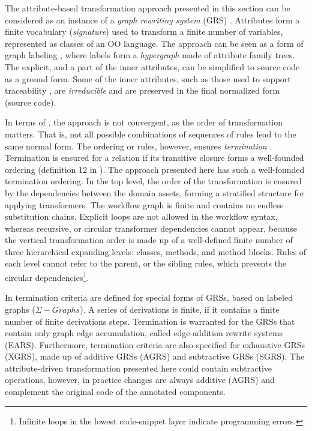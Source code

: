 The attribute-based transformation approach presented in this section can be considered as an instance of a \textit{graph rewriting system} (GRS) \cite{term.rewrite,Nagl:96,ehrig96computing,Blostein-Schuerr02:99,schuerr.95,schurr.graph.94,gr.99,assmann.00,Plump.2001}. Attributes form a finite vocabulary (\textit{signature}) used to transform a finite number of variables, represented as classes of an OO language. The approach can be seen as a form of graph labeling \cite{Plump.95,mens.99}, where labels form a \textit{hypergraph} \cite{Plump.95} made of attribute family trees. The explicit, and a part of the inner attributes, can be simplified to source code as a ground form. Some of the inner attributes, such as those used to support traceability , are \textit{irreducible} and are preserved in the final normalized form (source code).  

In terms of \cite{term.rewrite}, the approach is not convergent, as the order of transformation matters. That is, not all possible combinations of sequences of rules lead to the same normal form. The ordering or rules, however, ensures \textit{termination} \cite{Gramlich.96}. Termination is ensured for a relation if its transitive closure forms a well-founded ordering (definition 12 in \cite{term.rewrite}). The approach presented here has such a well-founded termination ordering. In the top level, the order of the transformation is ensured by the dependencies between the domain assets, forming a stratified \cite{datalog.89,assmann.00} structure for applying transformers. The workflow graph is finite and contains no endless substitution chains. Explicit loops are not allowed in the workflow syntax, whereas recursive, or circular transformer dependencies cannot appear, because the vertical transformation order is made up of a well-defined finite number of three hierarchical \cite{Ohlebusch.01} expanding levels: classes, methods, and method blocks. Rules of each level cannot refer to the parent, or the sibling rules, which prevents the circular dependencies\footnote{Infinite loops in the lowest code-snippet layer indicate programming errors.}.

In \cite{Assmann.94,Assmann.96} termination criteria are defined for special forms of GRSs, based on labeled graphs ($\Sigma-Graphs$). A series of derivations is finite, if it contains a finite number of finite derivations steps. Termination is warranted for the GRSs that contain only graph edge accumulation, called edge-addition rewrite systems (EARS). Furthermore, termination criteria are also specified for exhaustive GRSs (XGRS), made up of additive GRSs (AGRS) and subtractive GRSs (SGRS). The attribute-driven transformation presented here could contain subtractive operations, however, in practice changes are always additive (AGRS) and complement the original code of the annotated components.

